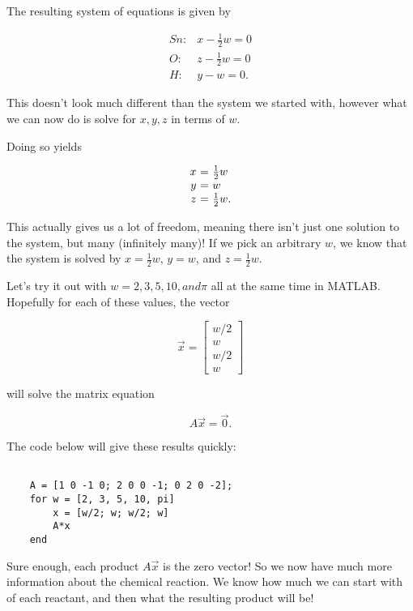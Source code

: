 \documentclass{ximera}
\begin{document}
\begin{solution}
The resulting system of equations is given by

\begin{equation*}
  \begin{array}{cl}
    Sn: & x - \frac{1}{2}w = 0 \\
    O: & z - \frac{1}{2}w = 0 \\
    H: & y - w = 0.
  \end{array}
\end{equation*}

This doesn't look much different than the system we started with, however what we can now do is solve for $x,y,z$ in terms of $w$. 

Doing so yields

\begin{equation*}
  \begin{array}{r@{~}c@{~}l}
    x &=& \frac{1}{2}w \\
    y &=& w \\
    z &=& \frac{1}{2}w.
  \end{array}
\end{equation*}

This actually gives us a lot of freedom, meaning there isn't just one solution to the system, but many (infinitely many)! If we pick an arbitrary $w$, we know that the system is solved by $x=\frac{1}{2}w$, $y=w$, and $z=\frac{1}{2}w$.

Let's try it out with $w=2, 3, 5, 10, and \pi$ all at the same time in MATLAB. Hopefully for each of these values, the vector 

$$\vec{x}=\begin{bmatrix} w/2 \\ w \\ w/2 \\ w \end{bmatrix}$$

will solve the matrix equation

$$A\vec{x}=\vec{0}.$$

The code below will give these results quickly:

\begin{verbatim}

    A = [1 0 -1 0; 2 0 0 -1; 0 2 0 -2];
    for w = [2, 3, 5, 10, pi]
        x = [w/2; w; w/2; w]
        A*x
    end

\end{verbatim}

Sure enough, each product $A\vec{x}$ is the zero vector! So we now have much more information about the chemical reaction. We know how much we can start with of each reactant, and then what the resulting product will be!


\end{solution}
\end{document}
